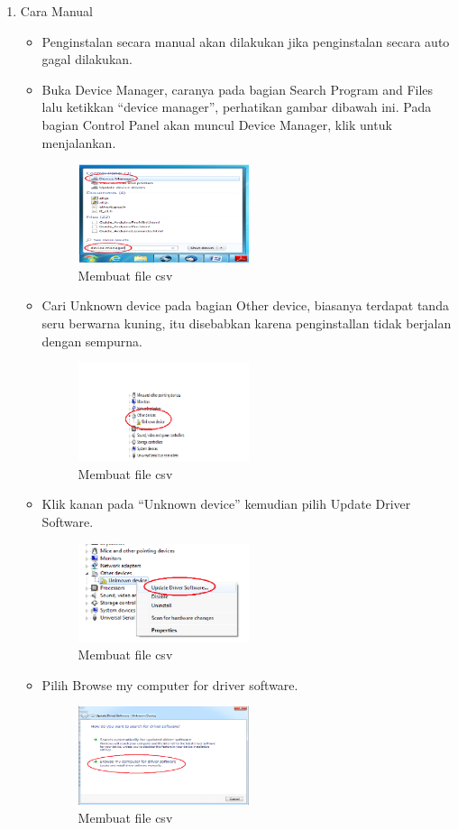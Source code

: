 \begin{enumerate}
\item Cara Manual

\begin{itemize}
\item Penginstalan secara manual akan dilakukan jika penginstalan secara auto gagal dilakukan.
\item Buka Device Manager, caranya pada bagian Search Program and Files lalu ketikkan “device manager”, perhatikan gambar dibawah ini. Pada bagian Control Panel akan muncul Device Manager, klik untuk menjalankan.
\begin{figure}[H] 
\includegraphics[width=5cm]{figures/5/Teori/1174005/4.png}
\centering
\caption{Membuat file csv}
\end{figure}

\item Cari Unknown device pada bagian Other device, biasanya terdapat tanda seru berwarna kuning, itu disebabkan karena penginstallan tidak berjalan dengan sempurna.
\begin{figure}[H] 
\includegraphics[width=5cm]{figures/5/Teori/1174005/5.png}
\centering
\caption{Membuat file csv}
\end{figure}

\item Klik kanan pada “Unknown device” kemudian pilih Update Driver Software.
\begin{figure}[H] 
\includegraphics[width=5cm]{figures/5/Teori/1174005/6.png}
\centering
\caption{Membuat file csv}
\end{figure}

\item Pilih Browse my computer for driver software.
\begin{figure}[H] 
\includegraphics[width=5cm]{figures/5/Teori/1174005/7.png}
\centering
\caption{Membuat file csv}
\end{figure}


\end{itemize}
\end{enumerate}
